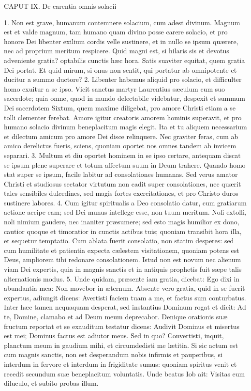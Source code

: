 CAPUT IX.
De carentia omnis solacii

1. Non est grave, humanum contemnere solacium, cum adest divinum. Magnum est et valde magnum, tam humano quam divino posse carere solacio, et pro honore Dei libenter exilium cordis velle sustinere, et in nullo se ipsum quærere, nec ad proprium meritum respicere. Quid magni est, si hilaris sis et devotus adveniente gratia? optabilis cunctis hæc hora. Satis suaviter equitat, quem gratia Dei portat. Et quid mirum, si onus non sentit, qui portatur ab omnipotente et ducitur a summo ductore?
2. Libenter habemus aliquid pro solacio, et difficulter homo exuitur a se ipso. Vicit sanctus martyr Laurentius sæculum cum suo sacerdote; quia omne, quod in mundo delectabile videbatur, despexit et summum Dei sacerdotem Sixtum, quem maxime diligebat, pro amore Christi etiam a se tolli clementer ferebat. Amore igitur creatoris amorem hominis superavit, et pro humano solacio divinum beneplacitum magis elegit. Ita et tu aliquem necessarium et dilectum amicum pro amore Dei disce relinquere. Nec graviter feras, cum ab amico derelictus fueris, sciens, quoniam oportet nos omnes tandem ab invicem separari.
3. Multum et diu oportet hominem in se ipso certare, antequam discat se ipsum plene superare et totum affectum suum in Deum trahere. Quando homo stat super se ipsum, facile labitur ad consolationes humanas. Sed verus amator Christi et studiosus sectator virtutum non cadit super consolationes, nec quærit tales sensibiles dulcedines, sed magis fortes exercitationes, et pro Christo duros sustinere labores.
4. Cum igitur spiritualis a Deo consolatio datur, cum gratiarum actione accipe eam; sed Dei munus intellege esse, non tuum meritum. Noli extolli, noli nimium gaudere, nec inaniter præsumere; sed esto magis humilior ex dono, cautior quoque et timoratior in cunctis actibus tuis; quoniam transibit hora illa, et sequetur temptatio. Cum ablata fuerit consolatio, non statim desperes: sed cum humilitate et patientia expecta cælestem visitationem, quoniam potens est Deus, ampliorem tibi redonare consolationem. Istud non est novum nec alienum viam Dei expertis, quia in magnis sanctis et in antiquis prophetis fuit sæpe talis alternationis modus.
5. Unde quidam, præsente iam gratia, dicebat: Ego dixi in abundantia mea: Non movebor in æternum. Absente vero gratia, quid in se fuerit expertus, adiungit dicens: Avertisti faciem tuam a me, et factus sum conturbatus. Inter hæc tamen nequaquam desperat, sed instantius Dominum rogat et dicit: Ad te, Domine, clamabo et ad Deum meum deprecabor. Denique orationis suæ fructum reportat et se exauditum testatur dicens: Audivit Dominus et misertus est mei; Dominus factus est adiutor meus. Sed in quo? Convertisti, inquit, planctum meum in gaudium mihi, et circumdedisti me lætitia. Si sic actum est cum magnis sanctis, non est desperandum nobis infirmis et pauperibus, si interdum in fervore et interdum in frigiditate sumus: quoniam spiritus venit et recedit secundum suæ beneplacitum voluntatis. Unde beatus Iob ait: Visitas eum diluculo, et subito probas illum.
